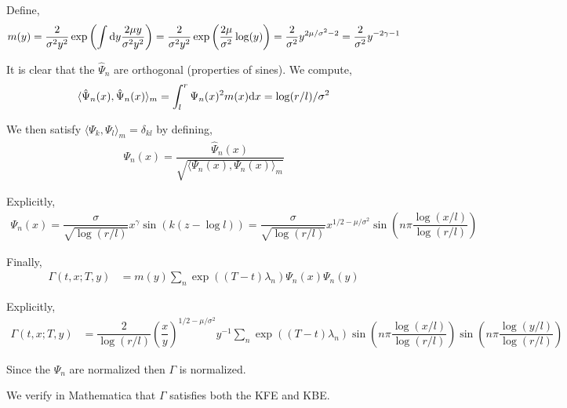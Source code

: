 \begin{solution}[Solution]
Define,
\begin{align*}
    m(y) = \dfrac{2}{\sigma^2 y^2} \exp \left( \int\mathrm{d} y \dfrac{2 \mu y}{\sigma^2y^2}\right) 
    = \dfrac{2}{\sigma^2y^2}\exp \left( \dfrac{2\mu}{\sigma^2} \log(y) \right) 
    = \dfrac{2}{\sigma^2} y^{2\mu/\sigma^2-2}
    = \dfrac{2}{\sigma^2} y^{-2\gamma-1}
\end{align*}

It is clear that the \( \hat{\Psi}_n \) are orthogonal (properties of sines). We compute,
\begin{align*}
    \langle \hat{\Psi}_n(x), \hat{\Psi}_n(x) \rangle_m 
    = \int_{l}^{r}\Psi_n(x)^2 m(x) \mathrm{d} x 
    = \log(r/l) / \sigma^2
\end{align*}

We then satisfy \( \langle \Psi_k ,\Psi_l \rangle_m = \delta_{kl} \) by defining,
\begin{align*}
    \Psi_n(x) = \dfrac{ \hat{\Psi}_n(x) }{\sqrt{\langle \Psi_n(x), \Psi_n(x) \rangle_m}}
\end{align*}

Explicitly,
\begin{align*}
    \Psi_n(x) = \dfrac{\sigma}{\sqrt{\log(r/l)}}x^{\gamma}\sin(k(z-\log l)) 
    = \dfrac{\sigma}{\sqrt{\log(r/l)}}x^{1/2 - \mu/\sigma^2} \sin \left( n\pi \dfrac{\log(x/l)}{\log(r/l)} \right)
\end{align*}


Finally,
\begin{align*}
    \Gamma(t,x;T,y) &= m(y) \sum_{n} \exp((T-t) \lambda_n) \Psi_n(x)\Psi_n(y) 
\end{align*}

Explicitly,
\begin{align*}
    \Gamma(t,x;T,y) &= \dfrac{2}{\log(r/l)} \left( \dfrac{x}{y} \right)^{1/2-\mu/\sigma^2}y^{-1} \sum_{n} \exp((T-t) \lambda_n) \sin \left( n\pi \dfrac{\log(x/l)}{\log(r/l)} \right) \sin \left( n\pi \dfrac{\log(y/l)}{\log(r/l)} \right)
\end{align*}

Since the \( \Psi_n \) are normalized then \( \Gamma \) is normalized.

We verify in Mathematica that \( \Gamma \) satisfies both the KFE and KBE.
\end{solution}

